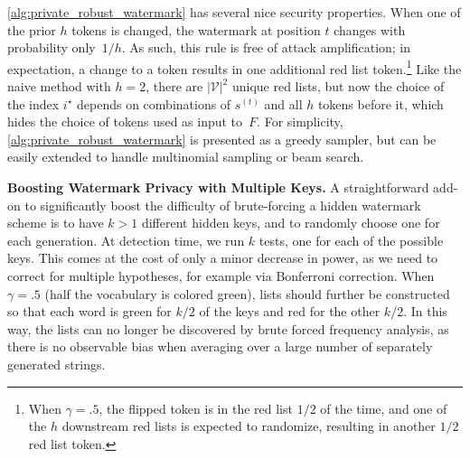 \documentclass{article}
\theoremstyle{plain}
\theoremstyle{definition}
\theoremstyle{remark}
\newcommand{\vocab}{\mathcal{V}}
\begin{document}
\cref{alg:private_robust_watermark} has several nice security properties. When one of the prior $h$ tokens is changed, the watermark at position $t$ changes with probability only~$1/h$. As such, this rule is free of attack amplification; in expectation, a change to a token results in one additional red list token.\footnote{When $\gamma=.5$, the flipped token is in the red list $1/2$ of the time, and one of the $h$ downstream red lists is expected to randomize, resulting in another $1/2$ red list token.} 
Like the naive method with $h=2$, there are $|\vocab|^2$ unique red lists, but now the choice of the index $i^\star$ depends on combinations of $s^{(t)}$ and all $h$ tokens before it, which hides the choice of tokens used as input to~$F$.  For simplicity, \cref{alg:private_robust_watermark} is presented as a greedy sampler, but can be easily extended to handle multinomial sampling or beam search. 

\textbf{Boosting Watermark Privacy with Multiple Keys.}
A straightforward add-on to significantly boost the difficulty of brute-forcing a hidden watermark scheme is to have $k>1$ different hidden keys, and to randomly choose one for each generation.  At detection time, we run $k$ tests, one for each of the possible keys. This comes at the cost of only a minor decrease in power, as we need to correct for multiple hypotheses, for example via Bonferroni correction. %
When $\gamma=.5$ (half the vocabulary is colored green), lists should further be constructed so that each word is green for $k/2$ of the keys and red for the other $k/2.$  In this way, the lists can no longer be discovered by brute forced frequency analysis, as there is no observable bias when averaging over a large number of separately generated strings.   

\end{document}
